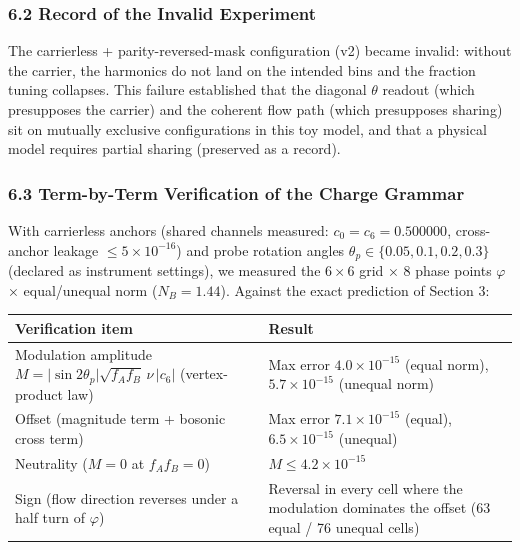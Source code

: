 \documentclass[
  a4paper,
]{article}
\newcounter{none} %
\begin{document}
\subsubsection{6.2 Record of the Invalid
Experiment}\label{record-of-the-invalid-experiment}

The carrierless + parity-reversed-mask configuration (v2) became
invalid: without the carrier, the harmonics do not land on the intended
bins and the fraction tuning collapses. This failure established that
the diagonal \(\theta\) readout (which presupposes the carrier) and the
coherent flow path (which presupposes sharing) sit on mutually exclusive
configurations in this toy model, and that a physical model requires
partial sharing (preserved as a record).

\subsubsection{6.3 Term-by-Term Verification of the Charge
Grammar}\label{term-by-term-verification-of-the-charge-grammar}

With carrierless anchors (shared channels measured:
\(c_0=c_6=0.500000\), cross-anchor leakage \(\le5\times10^{-16}\)) and
probe rotation angles \(\theta_p\in\{0.05,0.1,0.2,0.3\}\) (declared as
instrument settings), we measured the \(6\times6\) grid × 8 phase points
\(\varphi\) × equal/unequal norm (\(N_B=1.44\)). Against the exact
prediction of Section 3:

{\def\LTcaptype{none} %
\begin{longtable}[]{@{}
  >{\raggedright\arraybackslash}p{}
  >{\raggedright\arraybackslash}p{}@{}}
\toprule\noalign{}
\begin{minipage}[b]{\linewidth}\raggedright
Verification item
\end{minipage} & \begin{minipage}[b]{\linewidth}\raggedright
Result
\end{minipage} \\
\midrule\noalign{}
\endhead
\bottomrule\noalign{}
\endlastfoot
Modulation amplitude
\(M=\lvert\sin2\theta_p\rvert\sqrt{f_Af_B}\,\nu\,\lvert c_6\rvert\)
(vertex-product law) & Max error \(4.0\times10^{-15}\) (equal norm),
\(5.7\times10^{-15}\) (unequal norm) \\
Offset (magnitude term + bosonic cross term) & Max error
\(7.1\times10^{-15}\) (equal), \(6.5\times10^{-15}\) (unequal) \\
Neutrality (\(M=0\) at \(f_Af_B=0\)) & \(M\le4.2\times10^{-15}\) \\
Sign (flow direction reverses under a half turn of \(\varphi\)) &
Reversal in every cell where the modulation dominates the offset (63
equal / 76 unequal cells) \\
\end{longtable}
}
\end{document}
